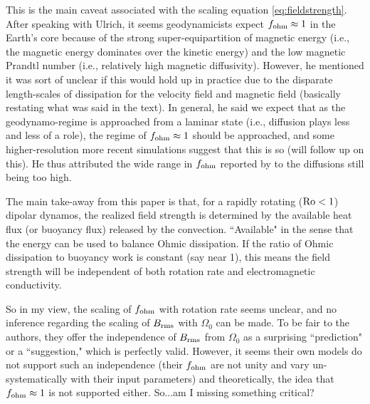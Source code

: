 \documentclass[12pt]{article} %
\begin{document}
This is the main caveat associated with the scaling equation \eqref{eq:fieldstrength}. After speaking with Ulrich, it seems geodynamicists expect $f_{\rm{ohm}}\approx1$ in the Earth's core because of the strong super-equipartition of magnetic energy (i.e., the magnetic energy dominates over the kinetic energy) and the low magnetic Prandtl number (i.e., relatively high magnetic diffusivity). However, he mentioned it was sort of unclear if this would hold up in practice due to the disparate length-scales of dissipation for the velocity field and magnetic field (basically restating what was said in the text). In general, he said we expect that as the geodynamo-regime is approached from a laminar state (i.e., diffusion plays less and less of a role), the regime of $f_{\rm{ohm}}\approx1$ should be approached, and some higher-resolution more recent simulations suggest that this is so (will follow up on this).  He thus attributed the wide range in $f_{\rm{ohm}}$ reported by \citet{Christensen2006} to the diffusions still being too high. 

The main take-away from this paper is that, for a rapidly rotating (${\rm{Ro}}<1$) dipolar dynamos, the realized field strength is determined by the available heat flux (or buoyancy flux) released by the convection. ``Available" in the sense that the energy can be used to balance Ohmic dissipation. If the ratio of Ohmic dissipation to buoyancy work is constant (say near 1), this means the field strength will be independent of both rotation rate and electromagnetic conductivity. 


So in my view, the scaling of $f_{\rm{ohm}}$ with rotation rate seems unclear, and no inference regarding the scaling of $B_{\rm{rms}}$ with $\Omega_0$  can be made. To be fair to the authors, they offer the independence of $B_{\rm{rms}}$ from $\Omega_0$ as a surprising ``prediction" or a ``suggestion," which is perfectly valid. However, it seems their own models do not support such an independence (their $f_{\rm{ohm}}$ are not unity and vary un-systematically with their input parameters) and theoretically, the idea that $f_{\rm{ohm}}\approx1$ is not supported either. So...am I missing something critical? 


\end{document}
